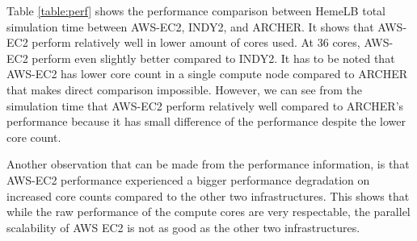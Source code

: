 \noindent%
\begin{minipage}{\linewidth}%
 \label{fig:hemelb-perf-overview}%
\end{minipage}

\vspace{0.5cm}


Table \ref{table:perf} shows the performance comparison between HemeLB total simulation time between AWS-EC2, INDY2, and ARCHER. It shows that AWS-EC2 perform relatively well in lower amount of cores used. At 36 cores, AWS-EC2 perform even slightly better compared to INDY2. It has to be noted that AWS-EC2 has lower core count in a single compute node compared to ARCHER that makes direct comparison impossible. However, we can see from the simulation time that AWS-EC2 perform relatively well compared to ARCHER's performance because it has small difference of the performance despite the lower core count. 


Another observation that can be made from the performance information, is that AWS-EC2 performance experienced a bigger performance degradation on increased core counts compared to the other two infrastructures.  This shows that while the raw performance of the compute cores are very respectable, the parallel scalability of AWS EC2 is not as good as the other two infrastructures.

